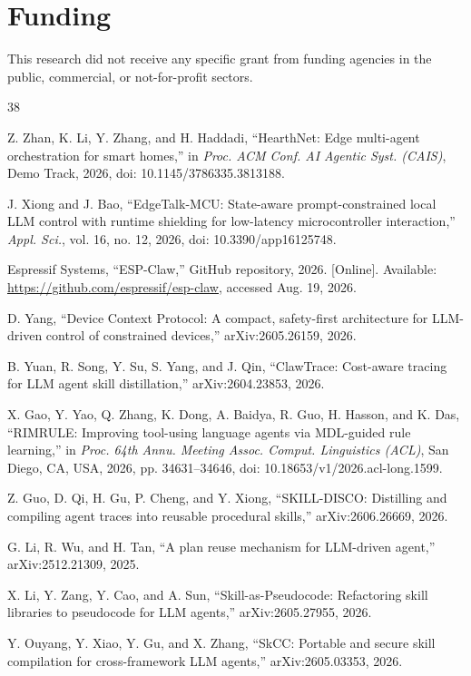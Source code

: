 \documentclass[review]{elsarticle}
\begin{document}
\section*{Funding}
This research did not receive any specific grant from funding agencies in the
public, commercial, or not-for-profit sectors.

\begin{thebibliography}{38}

 Z. Zhan, K. Li, Y. Zhang, and H. Haddadi, ``HearthNet: Edge
multi-agent orchestration for smart homes,'' in \emph{Proc. ACM Conf. AI
Agentic Syst. (CAIS)}, Demo Track, 2026, doi: 10.1145/3786335.3813188.

 J. Xiong and J. Bao, ``EdgeTalk-MCU: State-aware prompt-constrained
local LLM control with runtime shielding for low-latency microcontroller
interaction,'' \emph{Appl. Sci.}, vol. 16, no. 12, 2026, doi:
10.3390/app16125748.

 Espressif Systems, ``ESP-Claw,'' GitHub repository, 2026.
[Online]. Available: \url{https://github.com/espressif/esp-claw}, accessed
Aug. 19, 2026.

 D. Yang, ``Device Context Protocol: A compact, safety-first
architecture for LLM-driven control of constrained devices,''
arXiv:2605.26159, 2026.

 B. Yuan, R. Song, Y. Su, S. Yang, and J. Qin, ``ClawTrace:
Cost-aware tracing for LLM agent skill distillation,'' arXiv:2604.23853,
2026.

 X. Gao, Y. Yao, Q. Zhang, K. Dong, A. Baidya, R. Guo, H. Hasson,
and K. Das, ``RIMRULE: Improving tool-using language agents via MDL-guided
rule learning,'' in \emph{Proc. 64th Annu. Meeting Assoc. Comput. Linguistics
(ACL)}, San Diego, CA, USA, 2026, pp. 34631--34646, doi:
10.18653/v1/2026.acl-long.1599.

 Z. Guo, D. Qi, H. Gu, P. Cheng, and Y. Xiong, ``SKILL-DISCO:
Distilling and compiling agent traces into reusable procedural skills,''
arXiv:2606.26669, 2026.

 G. Li, R. Wu, and H. Tan, ``A plan reuse mechanism for LLM-driven
agent,'' arXiv:2512.21309, 2025.

 X. Li, Y. Zang, Y. Cao, and A. Sun, ``Skill-as-Pseudocode:
Refactoring skill libraries to pseudocode for LLM agents,'' arXiv:2605.27955,
2026.

 Y. Ouyang, Y. Xiao, Y. Gu, and X. Zhang, ``SkCC: Portable and
secure skill compilation for cross-framework LLM agents,'' arXiv:2605.03353,
2026.


\end{thebibliography}
\end{document}
